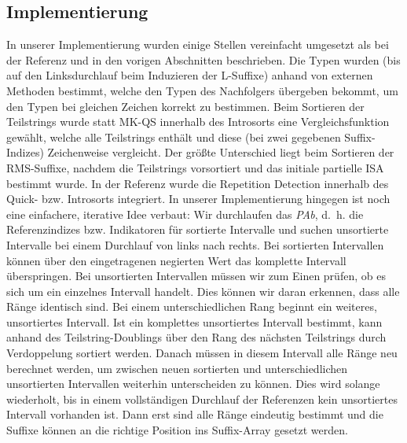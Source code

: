 \subsection{Implementierung}

In unserer Implementierung wurden einige Stellen vereinfacht umgesetzt als bei der Referenz und in den vorigen Abschnitten beschrieben. Die Typen wurden (bis auf den Linksdurchlauf beim Induzieren der L-Suffixe) anhand von externen Methoden bestimmt, welche den Typen des Nachfolgers übergeben bekommt, um den Typen bei gleichen Zeichen korrekt zu bestimmen. Beim Sortieren der Teilstrings wurde statt MK-QS innerhalb des Introsorts eine Vergleichsfunktion gewählt, welche alle Teilstrings enthält und diese (bei zwei gegebenen Suffix-Indizes) Zeichenweise vergleicht. 
Der größte Unterschied liegt beim Sortieren der RMS-Suffixe, nachdem die Teilstrings vorsortiert und das initiale partielle ISA bestimmt wurde. In der Referenz wurde die Repetition Detection innerhalb des Quick- bzw. Introsorts integriert. In unserer Implementierung hingegen ist noch eine einfachere, iterative Idee verbaut: Wir durchlaufen das \textit{PAb}, d.~h. die Referenzindizes bzw. Indikatoren für sortierte Intervalle und suchen unsortierte Intervalle bei einem Durchlauf von links nach rechts. Bei sortierten Intervallen können über den eingetragenen negierten Wert das komplette Intervall überspringen. Bei unsortierten Intervallen müssen wir zum Einen prüfen, ob es sich um ein einzelnes Intervall handelt. Dies können wir daran erkennen, dass alle Ränge identisch sind. Bei einem unterschiedlichen Rang beginnt ein weiteres, unsortiertes Intervall. Ist ein komplettes unsortiertes Intervall bestimmt, kann anhand des Teilstring-Doublings über den Rang des nächsten Teilstrings durch Verdoppelung sortiert werden. Danach müssen in diesem Intervall alle Ränge neu berechnet werden, um zwischen neuen sortierten und unterschiedlichen unsortierten Intervallen weiterhin unterscheiden zu können. Dies wird solange wiederholt, bis in einem vollständigen Durchlauf der Referenzen kein unsortiertes Intervall vorhanden ist. Dann erst sind alle Ränge eindeutig bestimmt und die Suffixe können an die richtige Position ins Suffix-Array gesetzt werden.